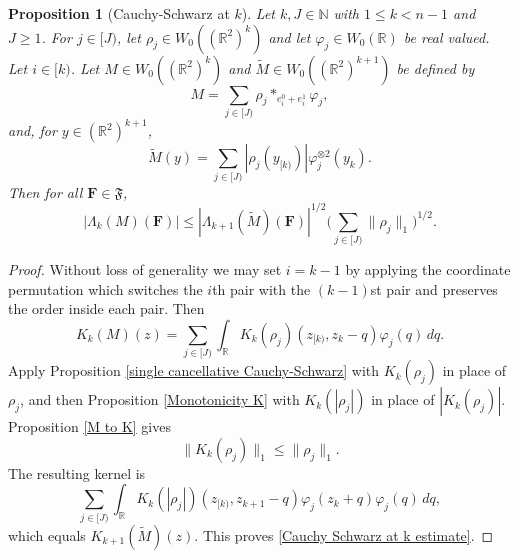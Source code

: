 \documentclass[12pt,reqno]{amsart}
\theoremstyle{plain}
\newtheorem{proposition}[theorem]{Proposition}
\numberwithin{equation}{section}
\theoremstyle{remark}
\newcommand{\uses}[1]{}
\newcommand{\usesdefs}[1]{}
\newcommand{\R}{{\mathbb R}}
\newcommand{\N}{{\mathbb N}}
\newcommand{\F}{\mathbf{F}}
\begin{document}
\begin{proposition}[Cauchy-Schwarz at $k$]\label{Cauchy-Schwarz at k}\uses{single cancellative Cauchy-Schwarz,Monotonicity K,M to K}\usesdefs{auto:Wiener-space-definition,auto:convolution-along-vector-definition,normalized function tuples,auto:prism-form-definition}
Let $k,J\in\N$ with $1\le k<n-1$ and $J\ge1$. For $j\in[J)$, let $\rho_j\in W_0((\R^2)^k)$ and let $\varphi_j\in W_0(\R)$ be real valued. Let $i\in[k)$. Let $M\in W_0((\R^2)^k)$ and $\widetilde M\in W_0((\R^2)^{k+1})$ be defined by
\begin{equation}\label{before CS}
M=\sum_{j\in[J)}\rho_j*_{e_i^0+e_i^1}\varphi_j,
\end{equation}
and, for $y\in(\R^2)^{k+1}$,
\begin{equation}\label{Cauchy Schwarz tilde M definition}
\widetilde M(y)=\sum_{j\in[J)}|\rho_j(y_{[k)})|\varphi_j^{\otimes2}(y_k).
\end{equation}
Then for all $\F\in\mathfrak F$,
\begin{equation}\label{Cauchy Schwarz at k estimate}
|\Lambda_k(M)(\F)|
\le
|\Lambda_{k+1}(\widetilde M)(\F)|^{1/2}
\Big(\sum_{j\in[J)}\|\rho_j\|_1\Big)^{1/2}.
\end{equation}
\end{proposition}
\begin{proof}
Without loss of generality we may set $i=k-1$ by applying the coordinate permutation which switches the $i$th pair with the $(k-1)$st pair and preserves the order inside each pair. Then
\[
K_k(M)(z)
=
\sum_{j\in[J)}\int_\R K_k(\rho_j)(z_{[k)},z_k-q)\varphi_j(q)\,dq.
\]
Apply Proposition \ref{single cancellative Cauchy-Schwarz} with $K_k(\rho_j)$ in place of $\rho_j$, and then Proposition \ref{Monotonicity K} with $K_k(|\rho_j|)$ in place of $|K_k(\rho_j)|$. Proposition \ref{M to K} gives
\[
\|K_k(\rho_j)\|_1\le\|\rho_j\|_1.
\]
The resulting kernel is
\[
\sum_{j\in[J)}\int_\R
K_k(|\rho_j|)(z_{[k)},z_{k+1}-q)
\varphi_j(z_k+q)\varphi_j(q)\,dq,
\]
which equals $K_{k+1}(\widetilde M)(z)$. This proves \eqref{Cauchy Schwarz at k estimate}.
\end{proof}
\end{document}

